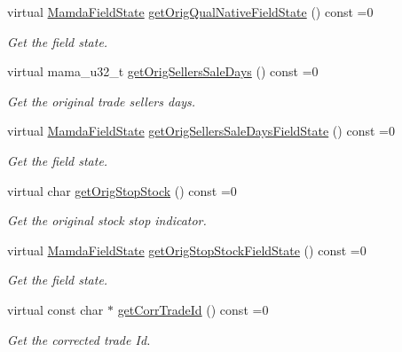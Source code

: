 \begin{CompactItemize}
virtual \hyperlink{namespaceWombat_93aac974f2ab713554fd12a1fa3b7d2a}{Mamda\-Field\-State} \hyperlink{classWombat_1_1MamdaTradeCorrection_2ca36bce716c8e36e31fc0b23c108d57}{get\-Orig\-Qual\-Native\-Field\-State} () const =0
\begin{CompactList}\small\item\em Get the field state. \item\end{CompactList}\item 
virtual mama\_\-u32\_\-t \hyperlink{classWombat_1_1MamdaTradeCorrection_22f105f9e575f3bc753d13ec1dbe003a}{get\-Orig\-Sellers\-Sale\-Days} () const =0
\begin{CompactList}\small\item\em Get the original trade sellers days. \item\end{CompactList}\item 
virtual \hyperlink{namespaceWombat_93aac974f2ab713554fd12a1fa3b7d2a}{Mamda\-Field\-State} \hyperlink{classWombat_1_1MamdaTradeCorrection_e0ffd31bf88ae2165d5d33f6fdcfd9e2}{get\-Orig\-Sellers\-Sale\-Days\-Field\-State} () const =0
\begin{CompactList}\small\item\em Get the field state. \item\end{CompactList}\item 
virtual char \hyperlink{classWombat_1_1MamdaTradeCorrection_d4603cdb9f1824cc39be134c9f0dc49f}{get\-Orig\-Stop\-Stock} () const =0
\begin{CompactList}\small\item\em Get the original stock stop indicator. \item\end{CompactList}\item 
virtual \hyperlink{namespaceWombat_93aac974f2ab713554fd12a1fa3b7d2a}{Mamda\-Field\-State} \hyperlink{classWombat_1_1MamdaTradeCorrection_7e60034450dfcaf39654b325bc487940}{get\-Orig\-Stop\-Stock\-Field\-State} () const =0
\begin{CompactList}\small\item\em Get the field state. \item\end{CompactList}\item 
virtual const char $\ast$ \hyperlink{classWombat_1_1MamdaTradeCorrection_9e1763eab254bbe87ff3a577bb7c5ab3}{get\-Corr\-Trade\-Id} () const =0
\begin{CompactList}\small\item\em Get the corrected trade Id. \item\end{CompactList}\item 

\end{CompactItemize}

